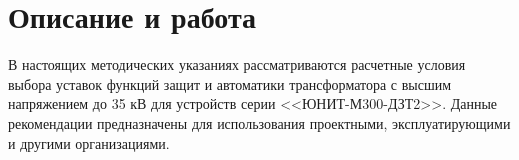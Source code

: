 {\color{unimain}\section[Описание и работа]{Описание и работа}}
\color{black}

В настоящих методических указаниях рассматриваются расчетные условия выбора уставок функций защит и автоматики трансформатора с высшим напряжением до 35 кВ для устройств серии <<ЮНИТ-М300-ДЗТ2>>. Данные рекомендации предназначены для использования проектными, эксплуатирующими и другими организациями.

